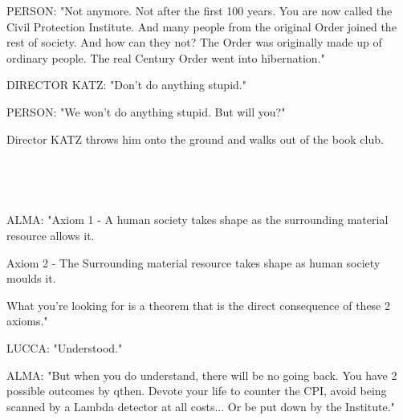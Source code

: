 \documentclass[11pt]{article}
\begin{document}
PERSON: "Not anymore. Not after the first 100 years.
You are now called the Civil Protection Institute.
And many people from the original Order joined the rest of society.
And how can they not? 
The Order was originally made up of ordinary people.
The real Century Order went into hibernation."

DIRECTOR KATZ: "Don't do anything stupid."

PERSON: "We won't do anything stupid.
But will you?"

Director KATZ throws him onto the ground and walks out of the book club.

\ 

\ 

ALMA: "Axiom 1 - A human society takes shape as the surrounding material resource allows it.

Axiom 2 - The Surrounding material resource takes shape as human society moulds it.

What you're looking for is a theorem that is the direct consequence of these 2 axioms."

LUCCA: "Understood."

ALMA: "But when you do understand, there will be no going back.
You have 2 possible outcomes by qthen.
Devote your life to counter the CPI, avoid being scanned by a Lambda detector at all costs...
Or be put down by the Institute."
\end{document}
